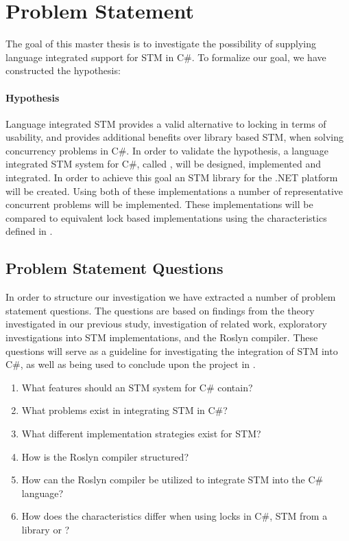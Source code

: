 \section{Problem Statement}\label{sec:problem_statement}
The goal of this master thesis is to investigate the possibility of supplying language integrated support for \ac{STM} in C\#. To formalize our goal, we have constructed the hypothesis:

\paragraph{Hypothesis} Language integrated \ac{STM} provides a valid alternative to locking in terms of usability, and provides additional benefits over library based \ac{STM}, when solving concurrency problems in C\#. 
In order to validate the hypothesis, a language integrated \ac{STM} system for C\#, called \stmname, will be designed, implemented and integrated. In order to achieve this goal an \ac{STM} library for the .NET platform will be created. Using both of these implementations a number of representative concurrent problems will be implemented. These implementations will be compared to equivalent lock based implementations using the characteristics defined in .

\subsection{Problem Statement Questions}
In order to structure our investigation we have extracted a number of problem statement questions. The questions are based on findings from the theory investigated in our previous study\cite{dpt907e14trending}, investigation of related work, exploratory investigations into \ac{STM} implementations, and the Roslyn compiler. These questions will serve as a guideline for investigating the integration of \ac{STM} into C\#, as well as being used to conclude upon the project in .

\begin{enumerate}
\item What features should an \ac{STM} system for C\# contain?
\item What problems exist in integrating \ac{STM} in C\#?
\item What different implementation strategies exist for \ac{STM}?
\item How is the Roslyn compiler structured?
\item How can the Roslyn compiler be utilized to integrate \ac{STM} into the C\# language?
\item How does the characteristics differ when using locks in C\#, \ac{STM} from a library or \stmname?
\end{enumerate}

